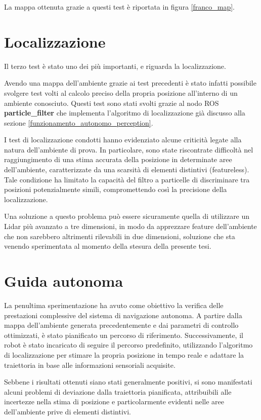 \noindent La mappa ottenuta grazie a questi test è riportata in figura \ref{franco_map}.
\section{Localizzazione}
Il terzo test è stato uno dei più importanti, e riguarda la localizzazione.

\noindent Avendo una mappa dell'ambiente grazie ai test precedenti è stato infatti possibile svolgere test volti al calcolo preciso della propria posizione all'interno di un ambiente conosciuto. Questi test sono stati svolti grazie al nodo ROS \textbf{particle\_filter} che implementa l'algoritmo di localizzazione già discusso alla sezione \ref{funzionamento_autonomo_perception}.

\noindent I test di localizzazione condotti hanno evidenziato alcune criticità legate alla natura dell'ambiente di prova. In particolare, sono state riscontrate difficoltà nel raggiungimento di una stima accurata della posizione in determinate aree dell'ambiente, caratterizzate da una scarsità di elementi distintivi (featureless). Tale condizione ha limitato la capacità del filtro a particelle di discriminare tra posizioni potenzialmente simili, compromettendo così la precisione della localizzazione.

\noindent Una soluzione a questo problema può essere sicuramente quella di utilizzare un Lidar più avanzato a tre dimensioni, in modo da apprezzare feature dell'ambiente che non sarebbero altrimenti rilevabili in due dimensioni, soluzione che sta venendo sperimentata al momento della stesura della presente tesi.

\section{Guida autonoma}
La penultima sperimentazione ha avuto come obiettivo la verifica delle prestazioni complessive del sistema di navigazione autonoma. A partire dalla mappa dell'ambiente generata precedentemente e dai parametri di controllo ottimizzati, è stato pianificato un percorso di riferimento. Successivamente, il robot è stato incaricato di seguire il percorso predefinito, utilizzando l'algoritmo di localizzazione per stimare la propria posizione in tempo reale e adattare la traiettoria in base alle informazioni sensoriali acquisite.

\noindent Sebbene i risultati ottenuti siano stati generalmente positivi, si sono manifestati alcuni problemi di deviazione dalla traiettoria pianificata, attribuibili alle incertezze nella stima di posizione e particolarmente evidenti nelle aree dell'ambiente prive di elementi distintivi.

